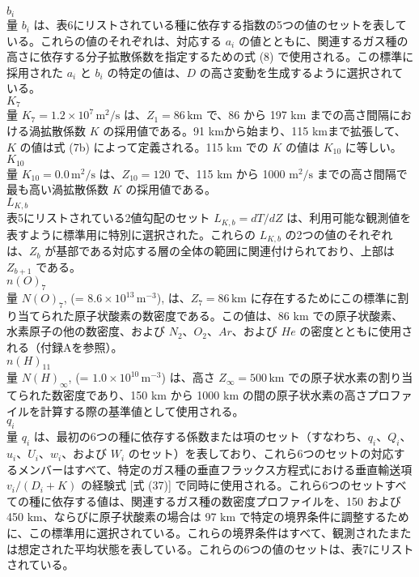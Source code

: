\documentclass{article}
\begin{document}
\\$b_i$\\
量 $b_i$ は、表6にリストされている種に依存する指数の5つの値のセットを表している。これらの値のそれぞれは、対応する $a_i$ の値とともに、関連するガス種の高さに依存する分子拡散係数を指定するための式 (8) で使用される。この標準に採用された $a_i$ と $b_i$ の特定の値は、$D$ の高さ変動を生成するように選択されている。
\\$K_7$\\
量 $K_7 = 1.2 \times 10^7 \, \mathrm{m^2/s}$ は、$Z_1 = 86 \, \mathrm{km}$ で、86 から 197 km までの高さ間隔における渦拡散係数 $K$ の採用値である。91 kmから始まり、115 kmまで拡張して、$K$ の値は式 (7b) によって定義される。115 km での $K$ の値は $K_{10}$ に等しい。
\\$K_{10}$\\
量 $K_{10} = 0.0 \, \text{m}^2/\text{s}$ は、$Z_{10} = 120$ で、115 km から 1000 $\text{m}^2/\text{s}$ までの高さ間隔で最も高い渦拡散係数 $K$ の採用値である。
\\$L_{K,b}$\\
表5にリストされている2値勾配のセット $L_{K,b} = dT/dZ$ は、利用可能な観測値を表すように標準用に特別に選択された。これらの $L_{K,b}$ の2つの値のそれぞれは、$Z_b$ が基部である対応する層の全体の範囲に関連付けられており、上部は $Z_{b+1}$ である。
\\$n(O)_7$\\
量 $N(O)_7$, (= $8.6 \times 10^{13} \, \text{m}^{-3}$), は、$Z_7 = 86 \, \text{km}$ に存在するためにこの標準に割り当てられた原子状酸素の数密度である。この値は、86 km での原子状酸素、水素原子の他の数密度、および $N_2$、$O_2$、$Ar$、および $He$ の密度とともに使用される（付録Aを参照）。
\\$n(H)_{11}$\\
量 $N(H)_\infty$, (= $1.0 \times 10^{10} \, \text{m}^{-3}$) は、高さ $Z_\infty = 500 \, \text{km}$ での原子状水素の割り当てられた数密度であり、150 km から 1000 km の間の原子状水素の高さプロファイルを計算する際の基準値として使用される。
\\$q_i$\\
量 $q_i$ は、最初の6つの種に依存する係数または項のセット（すなわち、$q_i$、$Q_i$、$u_i$、$U_i$、$w_i$、および $W_i$ のセット）を表しており、これら6つのセットの対応するメンバーはすべて、特定のガス種の垂直フラックス方程式における垂直輸送項 $v_i/(D_i+K)$ の経験式 [式 (37)] で同時に使用される。これら6つのセットすべての種に依存する値は、関連するガス種の数密度プロファイルを、150 および 450 $\mathrm{km}$、ならびに原子状酸素の場合は 97 $\mathrm{km}$ で特定の境界条件に調整するために、この標準用に選択されている。これらの境界条件はすべて、観測されたまたは想定された平均状態を表している。これらの6つの値のセットは、表7にリストされている。
\end{document}
